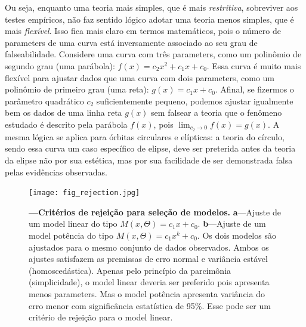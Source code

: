 \documentclass[./main.tex]{subfiles}
\begin{document}
\noindent Ou seja, enquanto uma \gls{teoria} mais simples, que é mais \textit{restritiva}, sobreviver aos testes empíricos, não faz sentido lógico adotar uma \gls{teoria} menos simples, que é mais \textit{flexível}. Isso fica mais claro em termos matemáticos, pois o número de \gls{parameters} de uma curva está inversamente associado ao seu grau de \gls{falseabilidade}. Considere uma curva com três \gls{parameters}, como um polinômio de segundo grau (uma parábola): $f(x) = c_{2}x^{2} + c_{1}x + c_{0}$. Essa curva é muito mais flexível para ajustar dados que uma curva com dois \gls{parameters}, como um polinômio de primeiro grau (uma reta): $g(x) = c_{1}x + c_{0}$. Afinal, se fizermos o parâmetro quadrático $c_{2}$ suficientemente pequeno, podemos ajustar igualmente bem os dados de uma linha reta $g(x)$ sem falsear a \gls{teoria} que o fenômeno estudado é descrito pela parábola $f(x)$, pois $\lim_{c_{2}\to0} f(x) = g(x)$. A mesma lógica se aplica para órbitas circulares e elípticas: a \gls{teoria} do círculo, sendo essa curva um caso específico de elipse, deve ser preterida antes da \gls{teoria} da elipse não por sua estética, mas por sua facilidade de ser demonstrada falsa pelas evidências observadas.
\begin{figure}[t!] %
	\centering				
	\texttt{[image: fig\_rejection.jpg]}		
	\caption[Critérios de rejeição para seleção de modelos]
	{\textbf{---\;Critérios de rejeição para seleção de modelos.}
        \;\textbf{a}\;---\;Ajuste de um \gls{model} linear do tipo $M(x, \Theta) = c_{1}x + c_{0}$. \;\textbf{b}\;---\;Ajuste de um \gls{model} potência do tipo $M(x, \Theta) = c_{1}x^{k} + c_{0}$. Os dois modelos são ajustados para o mesmo conjunto de dados observados. Ambos os ajustes satisfazem as premissas de erro normal e variância estável (homoscedástica). Apenas pelo princípio da parcimônia (simplicidade), o \gls{model} linear deveria ser preferido pois apresenta menos \gls{parameters}. Mas o \gls{model} potência apresenta variância do erro menor com significância estatística de 95\%. Esse pode ser um critério de rejeição para o \gls{model} linear. 
	}
\label{fig:rejection}  %
\end{figure}
\end{document}
